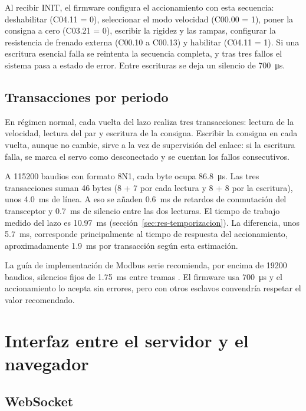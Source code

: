 Al recibir INIT, el firmware configura el accionamiento con esta secuencia: deshabilitar (C04.11 =
0), seleccionar el modo velocidad (C00.00 = 1), poner la consigna a cero (C03.21 = 0), escribir la
rigidez y las rampas, configurar la resistencia de frenado externa (C00.10 a C00.13) y habilitar
(C04.11 = 1). Si una escritura esencial falla se reintenta la secuencia completa, y tras tres fallos
el sistema pasa a estado de error. Entre escrituras se deja un silencio de
\SI{700}{\micro\second}.

\subsection{Transacciones por periodo}

En régimen normal, cada vuelta del lazo realiza tres transacciones: lectura de la velocidad, lectura
del par y escritura de la consigna. Escribir la consigna en cada vuelta, aunque no cambie, sirve a
la vez de supervisión del enlace: si la escritura falla, se marca el servo como desconectado y se
cuentan los fallos consecutivos.

A 115200 baudios con formato 8N1, cada byte ocupa \SI{86.8}{\micro\second}. Las tres transacciones
suman 46 bytes (8 + 7 por cada lectura y 8 + 8 por la escritura), unos \SI{4.0}{\milli\second} de
línea. A eso se añaden \SI{0.6}{\milli\second} de retardos de conmutación del transceptor y
\SI{0.7}{\milli\second} de silencio entre las dos lecturas. El tiempo de trabajo medido del lazo es
\SI{10.97}{\milli\second} (sección~\ref{sec:res-temporizacion}). La diferencia, unos
\SI{5.7}{\milli\second}, corresponde principalmente al tiempo de respuesta del accionamiento,
aproximadamente \SI{1.9}{\milli\second} por transacción según esta estimación.

La guía de implementación de Modbus serie recomienda, por encima de 19200 baudios, silencios fijos
de \SI{1.75}{\milli\second} entre tramas \cite{modbusserial}. El firmware usa
\SI{700}{\micro\second} y el accionamiento lo acepta sin errores, pero con otros esclavos
convendría respetar el valor recomendado.

\section{Interfaz entre el servidor y el navegador}

\subsection{WebSocket}

